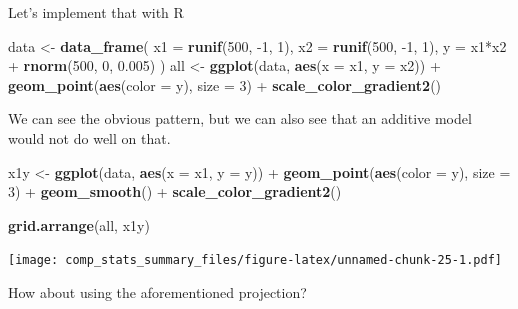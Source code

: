 \documentclass[]{book}
\newenvironment{Shaded}{\begin{snugshade}}{\end{snugshade}}
\newcommand{\KeywordTok}[1]{\textcolor[rgb]{0.13,0.29,0.53}{\textbf{{#1}}}}
\newcommand{\DataTypeTok}[1]{\textcolor[rgb]{0.13,0.29,0.53}{{#1}}}
\newcommand{\DecValTok}[1]{\textcolor[rgb]{0.00,0.00,0.81}{{#1}}}
\newcommand{\FloatTok}[1]{\textcolor[rgb]{0.00,0.00,0.81}{{#1}}}
\newcommand{\StringTok}[1]{\textcolor[rgb]{0.31,0.60,0.02}{{#1}}}
\newcommand{\NormalTok}[1]{{#1}}
\begin{document}
Let's implement that with R

\begin{Shaded}
\begin{Highlighting}[]
\NormalTok{data <-}\StringTok{ }\KeywordTok{data_frame}\NormalTok{(}
  \DataTypeTok{x1 =} \KeywordTok{runif}\NormalTok{(}\DecValTok{500}\NormalTok{, -}\DecValTok{1}\NormalTok{, }\DecValTok{1}\NormalTok{),}
  \DataTypeTok{x2 =} \KeywordTok{runif}\NormalTok{(}\DecValTok{500}\NormalTok{, -}\DecValTok{1}\NormalTok{, }\DecValTok{1}\NormalTok{),}
  \DataTypeTok{y =} \NormalTok{x1*x2 +}\StringTok{ }\KeywordTok{rnorm}\NormalTok{(}\DecValTok{500}\NormalTok{, }\DecValTok{0}\NormalTok{, }\FloatTok{0.005}\NormalTok{)}
\NormalTok{)}
\NormalTok{all <-}\StringTok{ }\KeywordTok{ggplot}\NormalTok{(data, }\KeywordTok{aes}\NormalTok{(}\DataTypeTok{x =} \NormalTok{x1, }\DataTypeTok{y =} \NormalTok{x2)) +}\StringTok{ }
\StringTok{  }\KeywordTok{geom_point}\NormalTok{(}\KeywordTok{aes}\NormalTok{(}\DataTypeTok{color =} \NormalTok{y), }\DataTypeTok{size =} \DecValTok{3}\NormalTok{) +}\StringTok{ }
\StringTok{  }\KeywordTok{scale_color_gradient2}\NormalTok{()}
\end{Highlighting}
\end{Shaded}

We can see the obvious pattern, but we can also see that an additive
model would not do well on that.

\begin{Shaded}
\begin{Highlighting}[]
\NormalTok{x1y <-}\StringTok{ }\KeywordTok{ggplot}\NormalTok{(data, }\KeywordTok{aes}\NormalTok{(}\DataTypeTok{x =} \NormalTok{x1, }\DataTypeTok{y =} \NormalTok{y)) +}\StringTok{ }
\StringTok{  }\KeywordTok{geom_point}\NormalTok{(}\KeywordTok{aes}\NormalTok{(}\DataTypeTok{color =} \NormalTok{y), }\DataTypeTok{size =} \DecValTok{3}\NormalTok{) +}\StringTok{ }
\StringTok{  }\KeywordTok{geom_smooth}\NormalTok{() +}\StringTok{ }
\StringTok{  }\KeywordTok{scale_color_gradient2}\NormalTok{()}


\KeywordTok{grid.arrange}\NormalTok{(all, x1y)}
\end{Highlighting}
\end{Shaded}

\texttt{[image: comp\_stats\_summary\_files/figure-latex/unnamed-chunk-25-1.pdf]}

How about using the aforementioned projection?
\end{document}
